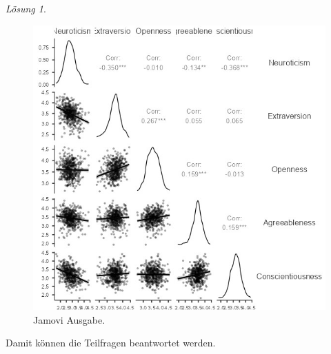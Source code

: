 \documentclass[
]{book}
\theoremstyle{definition}
\theoremstyle{definition}
\theoremstyle{definition}
\theoremstyle{definition}
\theoremstyle{remark}
\newtheorem*{solution}{Lösung}
\begin{document}
\begin{solution}
\begin{figure}
\includegraphics[width=1\linewidth]{figures/08-exr-big-five-cor-jmv-output-korrelationsmatrixdiagramm} \caption{Jamovi Ausgabe.}\label{fig:sol-big-five-cor-output-koorelationsmatrixdiagramm}
\end{figure}

Damit können die Teilfragen beantwortet werden.


\end{solution}
\end{document}
